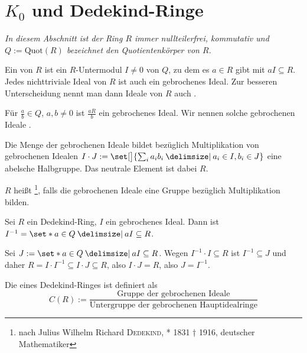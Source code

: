 \section{$K_0$ und Dedekind-Ringe} %
\label{sec:2}
\emph{In diesem Abschnitt ist der Ring $R$ immer nullteilerfrei, kommutativ und $Q := \mathrm{Quot}(R)$ bezeichnet den Quotientenkörper von $R$.}

\begin{definition}[{name=[{gebrochenes Ideal}]}]
	Ein  von $R$ ist ein $R$-Untermodul $I \neq 0$ von $Q$, zu dem es $a \in R$ gibt mit $a I \subseteq R$.
	Jedes nichttriviale Ideal von $R$ ist auch ein gebrochenes Ideal.
	Zur besseren Unterscheidung nennt man dann Ideale von $R$ auch .
	
	Für $\frac{a}{b} \in Q$, $a,b\neq 0$ ist $\frac{a R}{b}$ ein gebrochenes Ideal.
	Wir nennen solche gebrochenen Ideale .
\end{definition}

\begin{bemerkung}[{name=[{algebraische Struktur auf Menge der gebrochenen Ideale}]}]
	Die Menge der gebrochenen Ideale bildet bezüglich Multiplikation von gebrochenen Idealen $I \cdot J := \set[\big]{\sum_{i} a_i b_i \given a_i \in I, b_i \in J}$ eine abelsche Halbgruppe. 
	Das neutrale Element ist dabei $R$.
\end{bemerkung}

\begin{definition}[{name=[{Dedekind-Ring}]}]
	$R$ heißt \footnote{nach Julius Wilhelm Richard \textsc{Dedekind}, * 1831 † 1916, deutscher Mathematiker}, falls die gebrochenen Ideale eine Gruppe bezüglich Multiplikation bilden. 
\end{definition}

\begin{lemma}[{name=[Invereses eines gebrochenen Ideals]}]
	Sei $R$ ein Dedekind-Ring, $I$ ein gebrochenes Ideal.
	Dann ist $I^{-1} = \set*{a \in Q \given a I \subseteq R}$.
\end{lemma}
\begin{beweis}
	Sei $J:= \set*{a \in Q \given a I \subseteq R}$.
	Wegen $I^{-1} \cdot I \subseteq R$ ist $I^{-1} \subseteq J$ und daher $R = I \cdot I^{-1} \subseteq I \cdot J \subseteq R$, also $I \cdot J =R$, also $J=I^{-1}$.
\end{beweis}

\begin{definition}[{name=[{Klassengruppe}]}]
	Die  eines Dedekind-Ringes ist definiert als 
	\[
		C(R):=  \frac{\text{Gruppe der gebrochenen Ideale}}{\text{Untergruppe der gebrochenen Hauptidealringe}} 
	\]
\end{definition}

